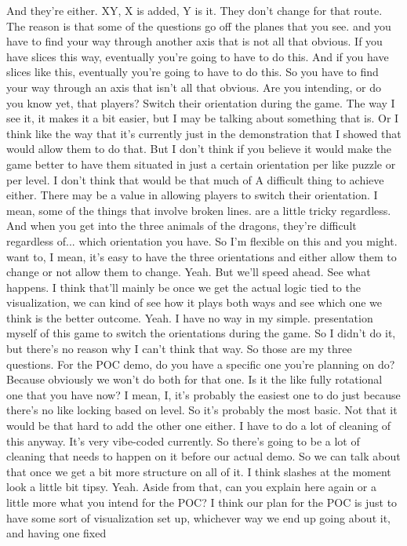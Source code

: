 \documentclass{article}
\begin{document}
And they're either.
XY, X is added, Y is it. They don't change for that route. The reason is that some of the questions go off the planes that you see.
and you have to find your way through another axis that is not all that obvious. If you have slices this way, eventually you're going to have to do this. And if you have slices like this, eventually you're going to have to do this. So you have to find your way through an axis that isn't all that obvious.
Are you intending, or do you know yet, that players?
Switch their orientation during the game.
The way I see it, it makes it a bit easier, but I may be talking about something that is.
Or I think like the way that it's currently just in the demonstration that I showed that would allow them to do that. But I don't think if you believe it would make the game better to have them situated in just a certain orientation per like puzzle or per level.
I don't think that would be that much of A difficult thing to achieve either. There may be a value in allowing players to switch their orientation. I mean, some of the things that involve broken lines.
are a little tricky regardless. And when you get into the three animals of the dragons, they're difficult regardless of...
which orientation you have. So I'm flexible on this and you might.
want to, I mean, it's easy to have the three orientations and either allow them to change or not allow them to change. Yeah. But we'll speed ahead. See what happens. I think that'll mainly be once we get the actual logic tied to the visualization, we can kind of see how it plays both ways and see which one we think is the better outcome. Yeah.
I have no way in my simple.
presentation myself of this game to switch the orientations during the game. So I didn't do it, but there's no reason why I can't think that way. So those are my three questions.
For the POC demo, do you have a specific one you're planning on do? Because obviously we won't do both for that one. Is it the like fully rotational one that you have now? I mean, I, it's probably the easiest one to do just because there's no like locking based on level. So it's probably the most basic.
Not that it would be that hard to add the other one either. I have to do a lot of cleaning of this anyway. It's very vibe-coded currently. So there's going to be a lot of cleaning that needs to happen on it before our actual demo. So we can talk about that once we get a bit more structure on all of it. I think slashes at the moment look a little bit tipsy.
Yeah. Aside from that, can you explain here again or a little more what you intend for the POC? I think our plan for the POC is just to have some sort of visualization set up, whichever way we end up going about it, and having one fixed
\end{document}
